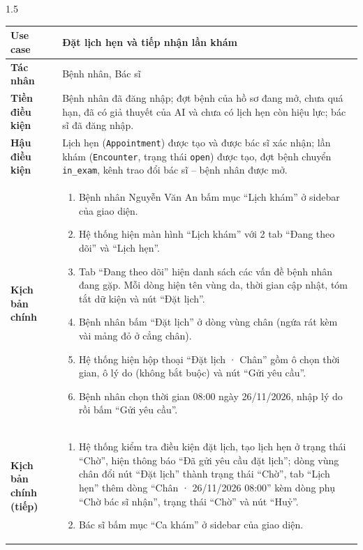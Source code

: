 \begin{spacing}{1.5}
\renewcommand{\arraystretch}{1.15}
\begin{longtable}{|>{\raggedright\arraybackslash}p{}|>{\raggedright\arraybackslash}p{}|}
\hline
\textbf{Use case} & Đặt lịch hẹn và tiếp nhận lần khám \\ \hline
\textbf{Tác nhân} & Bệnh nhân, Bác sĩ \\ \hline
\textbf{Tiền điều kiện} & Bệnh nhân đã đăng nhập; đợt bệnh của hồ sơ đang mở, chưa quá hạn, đã có giả thuyết của AI và chưa có lịch hẹn còn hiệu lực; bác sĩ đã đăng nhập. \\ \hline
\textbf{Hậu điều kiện} & Lịch hẹn (\texttt{Appointment}) được tạo và được bác sĩ xác nhận; lần khám (\texttt{Encounter}, trạng thái \texttt{open}) được tạo, đợt bệnh chuyển \texttt{in\_exam}, kênh trao đổi bác sĩ -- bệnh nhân được mở. \\ \hline
\textbf{Kịch bản chính} &
\begin{enumerate}[nosep,leftmargin=*]
  \item Bệnh nhân Nguyễn Văn An bấm mục ``Lịch khám'' ở sidebar của giao diện.
  \item Hệ thống hiện màn hình ``Lịch khám'' với 2 tab ``Đang theo dõi'' và ``Lịch hẹn''.
  \item Tab ``Đang theo dõi'' hiện danh sách các vấn đề bệnh nhân đang gặp. Mỗi dòng hiện tên vùng da, thời gian cập nhật, tóm tắt dữ kiện và nút ``Đặt lịch''.
  \item Bệnh nhân bấm ``Đặt lịch'' ở dòng vùng chân (ngứa rát kèm vài mảng đỏ ở cẳng chân).
  \item Hệ thống hiện hộp thoại ``Đặt lịch · Chân'' gồm ô chọn thời gian, ô lý do (không bắt buộc) và nút ``Gửi yêu cầu''.
  \item Bệnh nhân chọn thời gian 08:00 ngày 26/11/2026, nhập lý do rồi bấm ``Gửi yêu cầu''.
\end{enumerate} \\ \cline{2-2}
\textbf{Kịch bản chính (tiếp)} &
\begin{enumerate}[nosep,leftmargin=*,start=7]
  \item Hệ thống kiểm tra điều kiện đặt lịch, tạo lịch hẹn ở trạng thái ``Chờ'', hiện thông báo ``Đã gửi yêu cầu đặt lịch''; dòng vùng chân đổi nút ``Đặt lịch'' thành trạng thái ``Chờ'', tab ``Lịch hẹn'' thêm dòng ``Chân · 26/11/2026 08:00'' kèm dòng phụ ``Chờ bác sĩ nhận'', trạng thái ``Chờ'' và nút ``Huỷ''.
  \item Bác sĩ bấm mục ``Ca khám'' ở sidebar của giao diện.

\end{enumerate}
\end{longtable}
\end{spacing}
